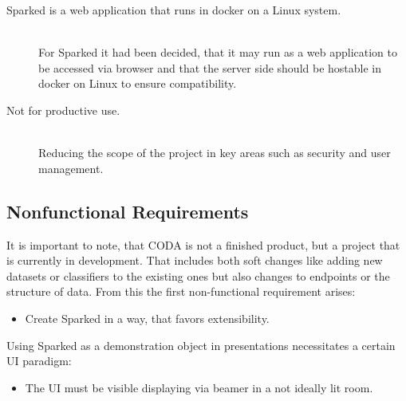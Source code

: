 \begin{description}
\item [Sparked is a web application that runs in docker on a Linux system.]\hfill \\
For Sparked it had been decided, that it may run as a web application to be accessed via browser and that the server side should be hostable in docker on Linux to ensure compatibility.
\end{description}

\begin{description}
\item [Not for productive use.]\hfill \\
Reducing the scope of the project in key areas such as security and user management.
\end{description}


\subsection{Nonfunctional Requirements}

It is important to note, that CODA is not a finished product, but a project that is currently in development. That includes both soft changes like adding new datasets or classifiers to the existing ones but also changes to endpoints or the structure of data. From this the first non-functional requirement arises:
\begin{itemize}
\item	Create Sparked in a way, that favors extensibility.
\end{itemize}

Using Sparked as a demonstration object in presentations necessitates a certain UI paradigm:
\begin{itemize}
\item	The UI must be visible displaying via beamer in a not ideally lit room.
\end{itemize}

